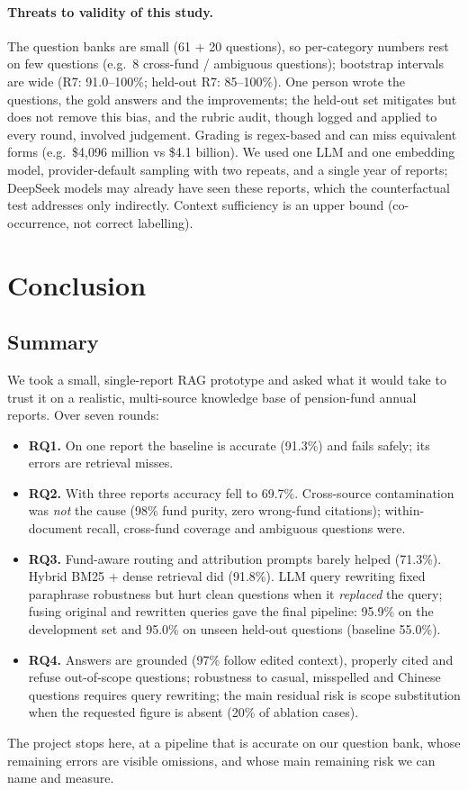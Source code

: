 \documentclass[11pt,a4paper]{article}
\begin{document}
\paragraph{Threats to validity of this study.}
The question banks are small (61 + 20 questions), so per-category numbers rest on few questions (e.g.\ 8 cross-fund /
ambiguous questions); bootstrap intervals are wide (R7: 91.0--100\%; held-out R7: 85--100\%). One person wrote the
questions, the gold answers and the improvements; the held-out set mitigates but does not remove this bias, and the
rubric audit, though logged and applied to every round, involved judgement. Grading is regex-based and can miss
equivalent forms (e.g.\ \$4,096 million vs \$4.1 billion). We used one LLM and one embedding model, provider-default
sampling with two repeats, and a single year of reports; DeepSeek models may already have seen these reports, which
the counterfactual test addresses only indirectly. Context sufficiency is an upper bound (co-occurrence, not correct
labelling).

\section{Conclusion}
\label{sec:conclusion}

\subsection{Summary}
We took a small, single-report RAG prototype and asked what it would take to trust it on a realistic, multi-source
knowledge base of pension-fund annual reports. Over seven rounds:
\begin{itemize}
  \item \textbf{RQ1.} On one report the baseline is accurate (91.3\%) and fails safely; its errors are retrieval
        misses.
  \item \textbf{RQ2.} With three reports accuracy fell to 69.7\%. Cross-source contamination was \emph{not} the cause
        (98\% fund purity, zero wrong-fund citations); within-document recall, cross-fund coverage and ambiguous
        questions were.
  \item \textbf{RQ3.} Fund-aware routing and attribution prompts barely helped (71.3\%). Hybrid BM25 + dense retrieval
        did (91.8\%). LLM query rewriting fixed paraphrase robustness but hurt clean questions when it
        \emph{replaced} the query; fusing original and rewritten queries gave the final pipeline: 95.9\% on the
        development set and 95.0\% on unseen held-out questions (baseline 55.0\%).
  \item \textbf{RQ4.} Answers are grounded (97\% follow edited context), properly cited and refuse out-of-scope
        questions; robustness to casual, misspelled and Chinese questions requires query rewriting; the main residual
        risk is scope substitution when the requested figure is absent (20\% of ablation cases).
\end{itemize}
The project stops here, at a pipeline that is accurate on our question bank, whose remaining errors are visible
omissions, and whose main remaining risk we can name and measure.
\end{document}
